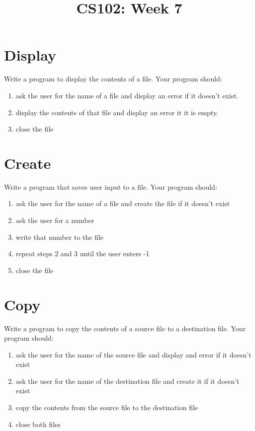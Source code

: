 \documentclass{article}
\begin{document}
\title{CS102: Week 7}

\maketitle

\section*{Display}
Write a program to display the contents of a file. Your program should:
\begin{enumerate}
	\item ask the user for the name of a file and display an error if it doesn't exist.
	\item display the contents of that file and display an error it it is empty.
	\item close the file
\end{enumerate}

\section*{Create}
Write a program that saves user input to a file. Your program should:
\begin{enumerate}
	\item ask the user for the name of a file and create the file if it doesn't exist
	\item ask the user for a number
	\item write that number to the file
	\item repeat steps 2 and 3 until the user enters -1
	\item close the file
\end{enumerate}

\section*{Copy}
Write a program to copy the contents of a source file to a destination file. Your program should:
\begin{enumerate}
	\item ask the user for the name of the source file and display and error if it doesn't exist
	\item ask the user for the name of the destination file and create it if it doesn't exist
	\item copy the contents from the source file to the destination file
	\item close both files
\end{enumerate}
\end{document}
